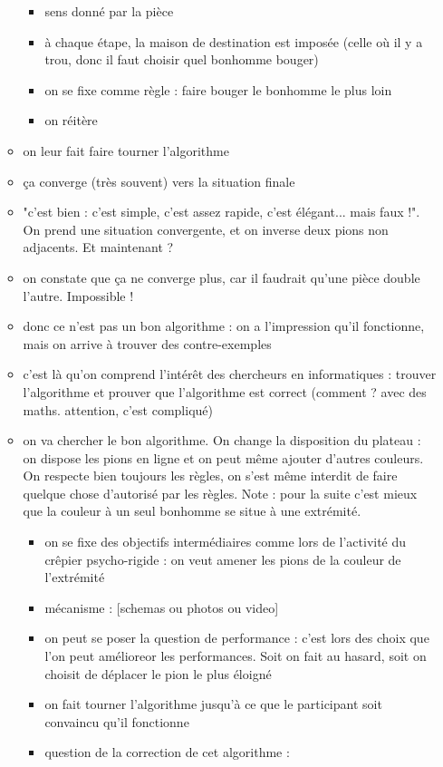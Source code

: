 \documentclass{article}
\begin{document}
\begin{itemize}
\begin{itemize}
\begin{itemize}
\item sens donné par la pièce
\item à chaque étape, la maison de destination est imposée (celle où il y a trou, donc il faut choisir quel bonhomme bouger)
\item on se fixe comme règle : faire bouger le bonhomme le plus loin
\item on réitère
\end{itemize}
\item on leur fait faire tourner l'algorithme
\item ça converge (très souvent) vers la situation finale
\item "c'est bien : c'est simple, c'est assez rapide, c'est élégant... mais faux !". On prend une situation convergente, et on inverse deux pions non adjacents. Et maintenant ?
\item on constate que ça ne converge plus, car il faudrait qu'une pièce double l'autre. Impossible !
\item donc ce n'est pas un bon algorithme : on a l'impression qu'il fonctionne, mais on arrive à trouver des contre-exemples
\item c'est là qu'on comprend l'intérêt des chercheurs en informatiques : trouver l'algorithme et prouver que l'algorithme est correct (comment ? avec des maths. attention, c'est compliqué)
\item on va chercher le bon algorithme. On change la disposition du plateau : on dispose les pions en ligne et on peut même ajouter d'autres couleurs. On respecte bien toujours les règles, on s'est même interdit de faire quelque chose d'autorisé par les règles. Note : pour la suite c'est mieux que la couleur à un seul bonhomme se situe à une extrémité.
\begin{itemize}
\item on se fixe des objectifs intermédiaires comme lors de l'activité du crêpier psycho-rigide : on veut amener les pions de la couleur de l'extrémité
\item mécanisme : [schemas ou photos ou video]
\item on peut se poser la question de performance : c'est lors des choix que l'on peut amélioreor les performances. Soit on fait au hasard, soit on choisit de déplacer le pion le plus éloigné
\item on fait tourner l'algorithme jusqu'à ce que le participant soit convaincu qu'il fonctionne
\item question de la correction de cet algorithme :

\end{itemize}
\end{itemize}
\end{itemize}
\end{document}
